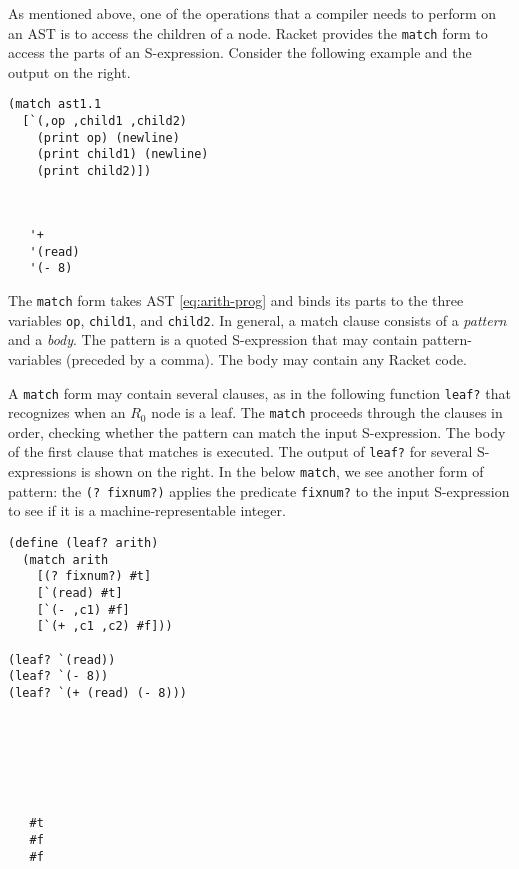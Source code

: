 \documentclass[11pt]{book}
\begin{document}
As mentioned above, one of the operations that a compiler needs to
perform on an AST is to access the children of a node.  Racket
provides the \texttt{match} form to access the parts of an
S-expression. Consider the following example and the output on the
right.
\begin{center}
\begin{minipage}{0.5\textwidth}
\begin{lstlisting}
(match ast1.1
  [`(,op ,child1 ,child2)
    (print op) (newline)
    (print child1) (newline)
    (print child2)])
\end{lstlisting}
\end{minipage}
\vrule
\begin{minipage}{0.25\textwidth}
\begin{lstlisting}


   '+
   '(read)
   '(- 8)
\end{lstlisting}
\end{minipage}
\end{center}
The \texttt{match} form takes AST \eqref{eq:arith-prog} and binds its
parts to the three variables \texttt{op}, \texttt{child1}, and
\texttt{child2}. In general, a match clause consists of a
\emph{pattern} and a \emph{body}. The pattern is a quoted S-expression
that may contain pattern-variables (preceded by a comma).  The body
may contain any Racket code.

A \texttt{match} form may contain several clauses, as in the following
function \texttt{leaf?} that recognizes when an $R_0$ node is
a leaf. The \texttt{match} proceeds through the clauses in order,
checking whether the pattern can match the input S-expression. The
body of the first clause that matches is executed. The output of
\texttt{leaf?} for several S-expressions is shown on the right. In the
below \texttt{match}, we see another form of pattern: the \texttt{(?
  fixnum?)} applies the predicate \texttt{fixnum?} to the input
S-expression to see if it is a machine-representable integer.
\begin{center}
\begin{minipage}{0.5\textwidth}
\begin{lstlisting}
(define (leaf? arith)
  (match arith
    [(? fixnum?) #t]
    [`(read) #t]
    [`(- ,c1) #f]
    [`(+ ,c1 ,c2) #f]))

(leaf? `(read))
(leaf? `(- 8))
(leaf? `(+ (read) (- 8)))
\end{lstlisting}
\end{minipage}
\vrule
\begin{minipage}{0.25\textwidth}
\begin{lstlisting}






   #t
   #f
   #f
\end{lstlisting}
\end{minipage}
\end{center}
\end{document}
